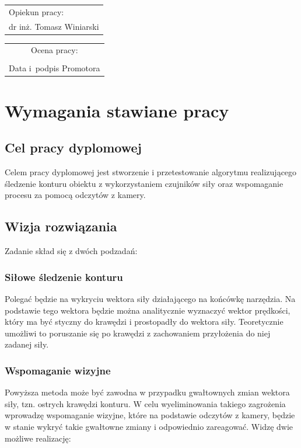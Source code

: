 \documentclass[12pt, a4paper, twoside]{book}
\begin{document}
\begin{titlepage}
			\vspace{20mm}
			\begin{flushright}
				\begin{tabular}{l}
					Opiekun pracy:\\
					\large dr inż. Tomasz Winiarski
				\end{tabular}
			\end{flushright}
			\vfill
			\begin{tabular}{c}
				\scriptsize Ocena pracy: \dotfill\\[10mm]
				\scriptsize \makebox[55mm]{\dotfill}\\
				\scriptsize Data i~podpis Promotora\\
				
			\end{tabular}
		\end{titlepage} 	


\newpage
\tableofcontents

\chapter{Wymagania stawiane pracy}
	\section{Cel pracy dyplomowej}
	Celem pracy dyplomowej jest stworzenie i przetestowanie algorytmu realizującego śledzenie konturu obiektu z wykorzystaniem czujników siły oraz wspomaganie procesu za pomocą odczytów z kamery.
	\section{Wizja rozwiązania}
	Zadanie skład się z dwóch podzadań:
		\subsection{Siłowe śledzenie konturu}
		Polegać będzie na wykryciu wektora siły działającego na końcówkę narzędzia. Na podstawie tego wektora będzie można analitycznie wyznaczyć wektor prędkości, który ma być styczny do krawędzi i prostopadły do wektora siły. Teoretycznie umożliwi to poruszanie się po krawędzi z zachowaniem przyłożenia do niej zadanej siły.
		\subsection{Wspomaganie wizyjne}
		Powyższa metoda może być zawodna w przypadku gwałtownych zmian wektora siły, tzn. ostrych krawędzi konturu. W celu wyeliminowania takiego zagrożenia wprowadzę wspomaganie wizyjne, które na podstawie odczytów z kamery, będzie w stanie wykryć takie gwałtowne zmiany i odpowiednio zareagować. Widzę dwie możliwe realizację:
\end{document}
